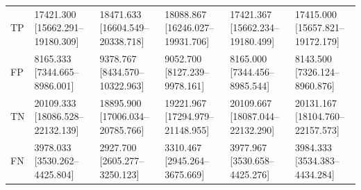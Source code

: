 \begin{tabular}{llllll}
TP & 17421.300 [15662.291--19180.309] & 18471.633 [16604.549--20338.718] & 18088.867 [16246.027--19931.706] & 17421.367 [15662.234--19180.499] & 17415.000 [15657.821--19172.179] \\
FP & 8165.333 [7344.665--8986.001] & 9378.767 [8434.570--10322.963] & 9052.700 [8127.239--9978.161] & 8165.000 [7344.456--8985.544] & 8143.500 [7326.124--8960.876] \\
TN & 20109.333 [18086.528--22132.139] & 18895.900 [17006.034--20785.766] & 19221.967 [17294.979--21148.955] & 20109.667 [18087.044--22132.290] & 20131.167 [18104.760--22157.573] \\
FN & 3978.033 [3530.262--4425.804] & 2927.700 [2605.277--3250.123] & 3310.467 [2945.264--3675.669] & 3977.967 [3530.658--4425.276] & 3984.333 [3534.383--4434.284] \\
\bottomrule
\end{tabular}
